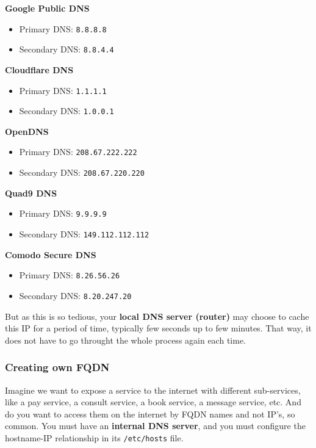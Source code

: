\documentclass{article}
\begin{document}
\textbf{Google Public DNS}
\begin{itemize}
    \item Primary DNS: \texttt{8.8.8.8}
    \item Secondary DNS: \texttt{8.8.4.4}
\end{itemize}
    
\textbf{Cloudflare DNS}
\begin{itemize}
    \item Primary DNS: \texttt{1.1.1.1}
    \item Secondary DNS: \texttt{1.0.0.1}
\end{itemize}
    
\textbf{OpenDNS}
\begin{itemize}
    \item Primary DNS: \texttt{208.67.222.222}
    \item Secondary DNS: \texttt{208.67.220.220}
\end{itemize}
    
\textbf{Quad9 DNS}
\begin{itemize}
    \item Primary DNS: \texttt{9.9.9.9}
    \item Secondary DNS: \texttt{149.112.112.112}
\end{itemize}
    
\textbf{Comodo Secure DNS}
\begin{itemize}
    \item Primary DNS: \texttt{8.26.56.26}
    \item Secondary DNS: \texttt{8.20.247.20}
\end{itemize}

But as this is so tedious, your \textbf{local DNS server (router)} may choose to cache this IP for a period of time, typically few seconds up to few minutes. That way, it does not have to go throught the whole process again each time.


\subsubsection{Creating own FQDN}

Imagine we want to expose a service to the internet with different sub-services, like a pay service, a consult service, a book service, a message service, etc. And do you want to access them on the internet by FQDN names and not IP's, so common. You must have an \textbf{internal DNS server}, and you must configure the hostname-IP relationship in its \verb|/etc/hosts| file.
\end{document}
